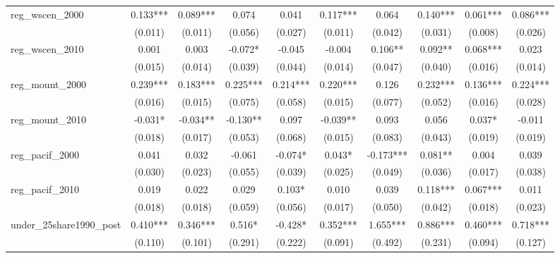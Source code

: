 \begin{table}[htbp]
\begin{tabular}{l*{9}{c}}
\addlinespace
reg\_wscen\_2000      &    0.133***&    0.089***&    0.074   &    0.041   &    0.117***&    0.064   &    0.140***&    0.061***&    0.086***\\
                    &  (0.011)   &  (0.011)   &  (0.056)   &  (0.027)   &  (0.011)   &  (0.042)   &  (0.031)   &  (0.008)   &  (0.026)   \\
\addlinespace
reg\_wscen\_2010      &    0.001   &    0.003   &   -0.072*  &   -0.045   &   -0.004   &    0.106** &    0.092** &    0.068***&    0.023   \\
                    &  (0.015)   &  (0.014)   &  (0.039)   &  (0.044)   &  (0.014)   &  (0.047)   &  (0.040)   &  (0.016)   &  (0.014)   \\
\addlinespace
reg\_mount\_2000      &    0.239***&    0.183***&    0.225***&    0.214***&    0.220***&    0.126   &    0.232***&    0.136***&    0.224***\\
                    &  (0.016)   &  (0.015)   &  (0.075)   &  (0.058)   &  (0.015)   &  (0.077)   &  (0.052)   &  (0.016)   &  (0.028)   \\
\addlinespace
reg\_mount\_2010      &   -0.031*  &   -0.034** &   -0.130** &    0.097   &   -0.039** &    0.093   &    0.056   &    0.037*  &   -0.011   \\
                    &  (0.018)   &  (0.017)   &  (0.053)   &  (0.068)   &  (0.015)   &  (0.083)   &  (0.043)   &  (0.019)   &  (0.019)   \\
\addlinespace
reg\_pacif\_2000      &    0.041   &    0.032   &   -0.061   &   -0.074*  &    0.043*  &   -0.173***&    0.081** &    0.004   &    0.039   \\
                    &  (0.030)   &  (0.023)   &  (0.055)   &  (0.039)   &  (0.025)   &  (0.049)   &  (0.036)   &  (0.017)   &  (0.038)   \\
\addlinespace
reg\_pacif\_2010      &    0.019   &    0.022   &    0.029   &    0.103*  &    0.010   &    0.039   &    0.118***&    0.067***&    0.011   \\
                    &  (0.018)   &  (0.018)   &  (0.059)   &  (0.056)   &  (0.017)   &  (0.050)   &  (0.042)   &  (0.018)   &  (0.023)   \\
\addlinespace
under\_25share1990\_post&    0.410***&    0.346***&    0.516*  &   -0.428*  &    0.352***&    1.655***&    0.886***&    0.460***&    0.718***\\
                    &  (0.110)   &  (0.101)   &  (0.291)   &  (0.222)   &  (0.091)   &  (0.492)   &  (0.231)   &  (0.094)   &  (0.127)   \\

\end{tabular}
\end{table}
